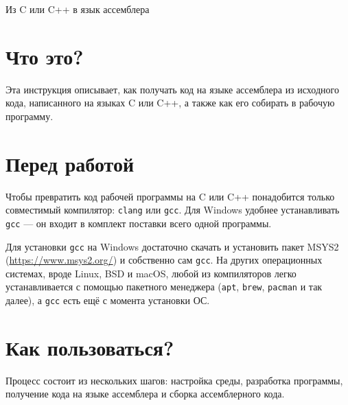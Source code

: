 \documentclass[a4paper,oneside,DIV=12,12pt]{scrartcl}
\DeclareRobustCommand{\xbseries}{\fontseries{xb}\selectfont}
\newcommand{\MyDocTitle}[1]{{\centering\titlefont\xbseries\Large#1\par}\vspace{3\baselineskip}} %
\newcommand{\progname}[1]{\texttt{#1}}
\newcommand{\allcaps}[1]{%
	{\addfontfeatures{LetterSpace = 5}#1}%
}
\begin{document}
	\MyDocTitle{Из C или C++ в язык ассемблера}
	
	
	\section{Что это?}
		Эта инструкция описывает, как получать код на языке ассемблера из исходного кода, написанного на языках C или C++, а также как его собирать в рабочую программу.
		
	\section{Перед работой}
		Чтобы превратить код рабочей программы на C или C++ понадобится только совместимый компилятор: \progname{clang} или \progname{gcc}. Для Windows удобнее устанавливать \progname{gcc} — он входит в комплект поставки всего одной программы.
		
		Для установки \progname{gcc} на Windows достаточно скачать и установить пакет \allcaps{MSYS2} (\url{https://www.msys2.org/}) и собственно сам \progname{gcc}. На других операционных системах, вроде Linux, BSD и macOS, любой из компиляторов легко устанавливается с помощью пакетного менеджера (\progname{apt}, \progname{brew}, \progname{pacman} и так далее), а \progname{gcc} есть ещё с момента установки ОС.
		
	\section{Как пользоваться?}
		Процесс состоит из нескольких шагов: настройка среды, разработка программы, получение кода на языке ассемблера и сборка ассемблерного кода.
		
\end{document}
